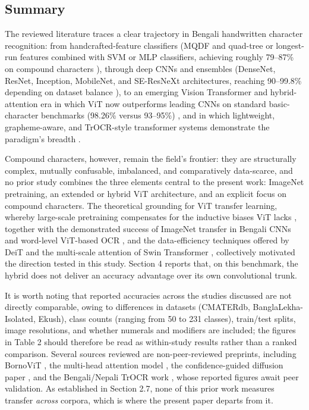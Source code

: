 \hypertarget{summary}{%
\subsection{Summary}\label{summary}}

The reviewed literature traces a clear trajectory in Bengali handwritten
character recognition: from handcrafted-feature classifiers (MQDF and
quad-tree or longest-run features combined with SVM or MLP classifiers,
achieving roughly 79--87\% on compound characters \citep{ref1,ref2,ref3,ref4,ref5,ref6}),
through deep CNNs and ensembles (DenseNet, ResNet, Inception,
MobileNet, and SE-ResNeXt architectures, reaching 90--99.8\% depending
on dataset balance \citep{ref7,ref8,ref9,ref10,ref11,ref12,ref13,ref14,ref15,ref16,ref23}), to an emerging Vision
Transformer and hybrid-attention era in which ViT now outperforms
leading CNNs on standard basic-character benchmarks (98.26\% versus
93--95\%) \citep{ref17}, and in which lightweight, grapheme-aware, and
TrOCR-style transformer systems demonstrate the paradigm's breadth
\citep{ref18,ref19,ref20,ref21,ref25}.

Compound characters, however, remain the field's frontier: they are
structurally complex, mutually confusable, imbalanced, and comparatively
data-scarce, and no prior study combines the three elements central to
the present work: ImageNet pretraining, an extended or hybrid ViT
architecture, and an explicit focus on compound characters. The
theoretical grounding for ViT transfer learning, whereby large-scale
pretraining compensates for the inductive biases ViT lacks \citep{ref22},
together with the demonstrated success of ImageNet transfer in Bengali
CNNs \citep{ref11,ref12} and word-level ViT-based OCR \citep{ref21}, and the
data-efficiency techniques offered by DeiT \citep{ref41} and the multi-scale
attention of Swin Transformer \citep{ref42}, collectively motivated the direction tested in this study. Section 4 reports that, on this benchmark, the hybrid does not deliver an accuracy advantage over its own convolutional trunk.

It is worth noting that reported accuracies across the studies discussed
are not directly comparable, owing to differences in datasets (CMATERdb,
BanglaLekha-Isolated, Ekush), class counts (ranging from 50 to 231
classes), train/test splits, image resolutions, and whether numerals and
modifiers are included; the figures in Table 2 should therefore be
read as within-study results rather than a ranked comparison. Several
sources reviewed are non-peer-reviewed preprints, including BornoViT
\citep{ref18}, the multi-head attention model \citep{ref25}, the confidence-guided
diffusion paper \citep{ref24}, and the Bengali/Nepali TrOCR work \citep{ref21},
whose reported figures await peer validation. As established in Section
2.7, none of this prior work measures transfer \emph{across} corpora,
which is where the present paper departs from it.


